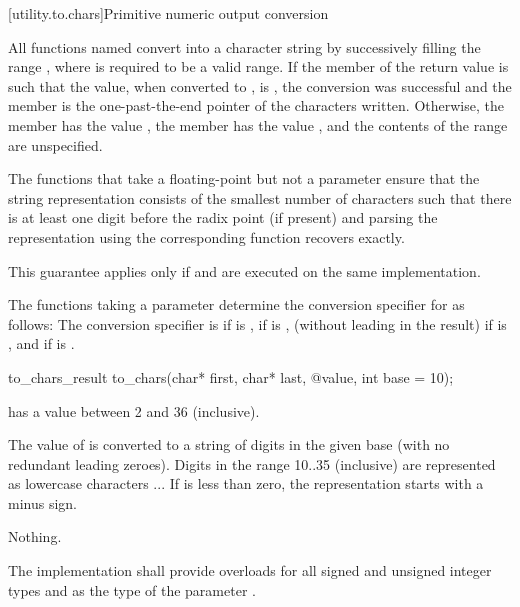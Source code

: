 [utility.to.chars]{Primitive numeric output conversion}

\pnum
All functions named 
convert  into a character string
by successively filling the range
,
where  is required to be a valid range.
If the member 
of the return value
is such that the value,
when converted to ,
is ,
the conversion was successful
and the member 
is the one-past-the-end pointer of the characters written.
Otherwise,
the member  has the value ,
the member  has the value ,
and the contents of the range  are unspecified.

\pnum
The functions that take a floating-point 
but not a  parameter
ensure that the string representation
consists of the smallest number of characters
such that
there is at least one digit before the radix point (if present) and
parsing the representation using the corresponding  function
recovers  exactly.
\begin{note}
This guarantee applies only if
 and 
are executed on the same implementation.
\end{note}

\pnum
The functions taking a  parameter
determine the conversion specifier for  as follows:
The conversion specifier is
 if  is ,
 if  is ,
 (without leading  in the result)
if  is ,
and
 if  is .

%
\begin{itemdecl}
to_chars_result to_chars(char* first, char* last, @\seebelow@ value, int base = 10);
\end{itemdecl}

\begin{itemdescr}
\pnum
\requires {} has a value between 2 and 36 (inclusive).

\pnum
\effects The value of  is converted
to a string of digits in the given base
(with no redundant leading zeroes).
Digits in the range 10..35 (inclusive)
are represented as lowercase characters ...
If  is less than zero,
the representation starts with a minus sign.

\pnum
\throws Nothing.

\pnum
\remarks
The implementation shall provide overloads
for all signed and unsigned integer types
and 
as the type of the parameter .
\end{itemdescr}

